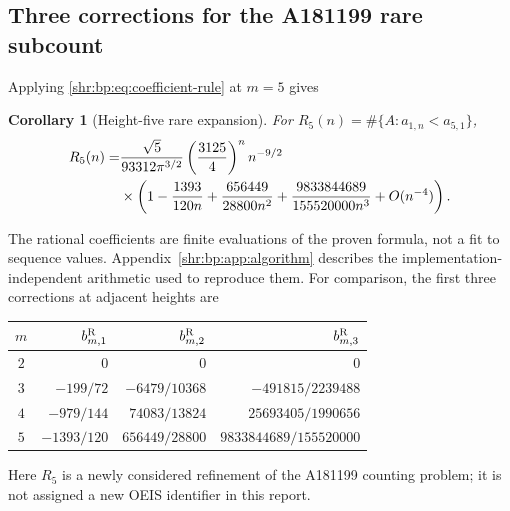 \documentclass[11pt,letterpaper]{article}
\numberwithin{equation}{section}
\newtheorem{corollary}[theorem]{Corollary}
\theoremstyle{definition}
\newcommand{\1}{\mathbf 1}
\begin{document}
\subsection{Three corrections for the A181199 rare subcount}
Applying \eqref{shr:bp:eq:coefficient-rule} at $m=5$ gives
\begin{corollary}[Height-five rare expansion]
\label{shr:bp:cor:five}
For $R_5(n)=\#\{A:a_{1,n}<a_{5,1}\}$,
\begin{align}
 R_5(n)=&\frac{\sqrt5}{93312\pi^{3/2}}
 \left(\frac{3125}{4}\right)^n n^{-9/2}\notag\\
 &\times\left(1-\frac{1393}{120n}
 +\frac{656449}{28800n^2}
 +\frac{9833844689}{155520000n^3}
 +O(n^{-4})\right).
 \label{shr:bp:eq:five}
\end{align}
\end{corollary}
The rational coefficients are finite evaluations of the proven formula,
not a fit to sequence values. Appendix~\ref{shr:bp:app:algorithm} describes the
implementation-independent arithmetic used to reproduce them.
For comparison, the first three corrections at adjacent heights are
\begin{center}\small
\begin{tabular}{@{}crrr@{}}
\toprule
$m$ & $b_{m,1}^{\rm R}$ & $b_{m,2}^{\rm R}$ & $b_{m,3}^{\rm R}$\\
\midrule
$2$ & $0$ & $0$ & $0$\\[2pt]
$3$ & $-199/72$ & $-6479/10368$ & $-491815/2239488$\\[2pt]
$4$ & $-979/144$ & $74083/13824$ & $25693405/1990656$\\[2pt]
$5$ & $-1393/120$ & $656449/28800$ & $9833844689/155520000$\\
\bottomrule
\end{tabular}
\end{center}
Here $R_5$ is a newly considered refinement of the A181199 counting
problem; it is not assigned a new OEIS identifier in this report.
\end{document}
